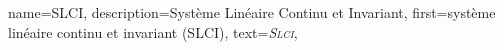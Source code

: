 {%
  name={SLCI},%
  description={Système Linéaire Continu et Invariant},%
  first={système lin\-éaire con\-tinu et inva\-riant (SLCI)},%
  text={\emph{{\scshape Slci}}},%
}
